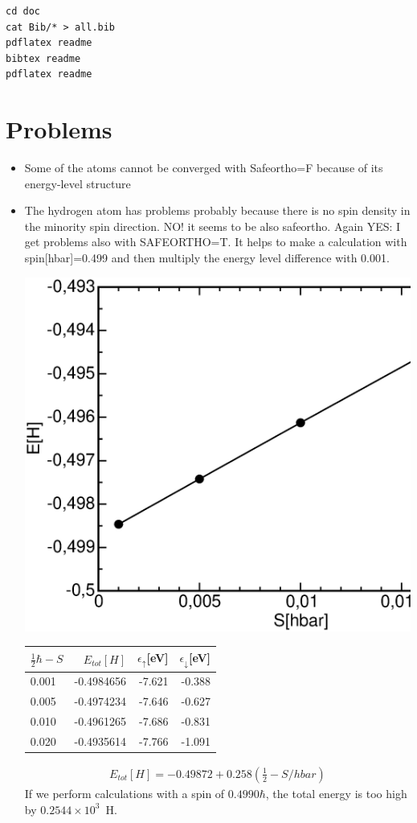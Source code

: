\documentclass{book}
\begin{document}
\begin{verbatim}
cd doc
cat Bib/* > all.bib
pdflatex readme
bibtex readme
pdflatex readme
\end{verbatim}


\section*{Problems}
\begin{itemize}
\item Some of the atoms cannot be converged with Safeortho=F because of 
its energy-level structure
\item The hydrogen atom has problems probably because there is no spin
density in the minority spin direction. NO! it seems to be also
safeortho. Again YES: I get problems also with SAFEORTHO=T. It helps
to make a calculation with spin[hbar]=0.499 and then multiply the
energy level difference with 0.001. 
\begin{center}
\includegraphics[width=0.5\linewidth,clip=t]{Figs/hydrogenetot.eps}
\begin{tabular}{|l|r|r|r|}
\hline
$\frac{1}{2}\hbar-S$ & $E_{tot}[H]$ & $\epsilon_\uparrow$[eV]& $\epsilon_\downarrow$[eV] \\
\hline
0.001 &  -0.4984656 &  -7.621&   -0.388 \\
0.005 &  -0.4974234 &  -7.646&   -0.627\\ 
0.010 &  -0.4961265 &  -7.686&   -0.831 \\
0.020 &  -0.4935614 &  -7.766&   -1.091 \\
\hline
\end{tabular}
\end{center}
\begin{eqnarray*}
E_{tot}[H]=-0.49872+0.258(\frac{1}{2}-S/hbar)
\end{eqnarray*}
If we perform calculations with a spin of $0.4990 \hbar$, the total
energy is too high by $0.2544\times 10^3$~H.


\end{itemize}
\end{document}

